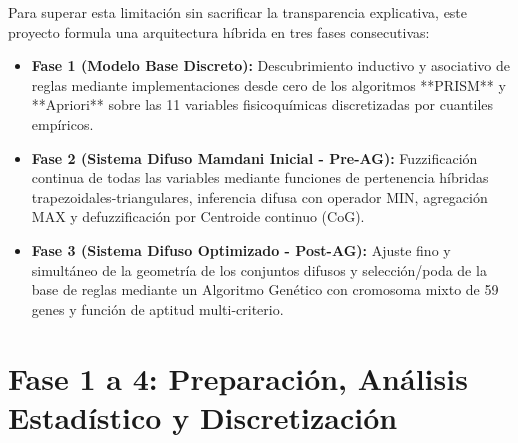 \documentclass[11pt,a4paper]{article}
\begin{document}
Para superar esta limitación sin sacrificar la transparencia explicativa, este proyecto formula una arquitectura híbrida en tres fases consecutivas:
\begin{itemize}[noitemsep]
    \item \textbf{Fase 1 (Modelo Base Discreto):} Descubrimiento inductivo y asociativo de reglas mediante implementaciones desde cero de los algoritmos **PRISM** y **Apriori** sobre las 11 variables fisicoquímicas discretizadas por cuantiles empíricos.
    \item \textbf{Fase 2 (Sistema Difuso Mamdani Inicial - Pre-AG):} Fuzzificación continua de todas las variables mediante funciones de pertenencia híbridas trapezoidales-triangulares, inferencia difusa con operador MIN, agregación MAX y defuzzificación por Centroide continuo (CoG).
    \item \textbf{Fase 3 (Sistema Difuso Optimizado - Post-AG):} Ajuste fino y simultáneo de la geometría de los conjuntos difusos y selección/poda de la base de reglas mediante un Algoritmo Genético con cromosoma mixto de 59 genes y función de aptitud multi-criterio.
\end{itemize}

\section{Fase 1 a 4: Preparación, Análisis Estadístico y Discretización}
\end{document}
